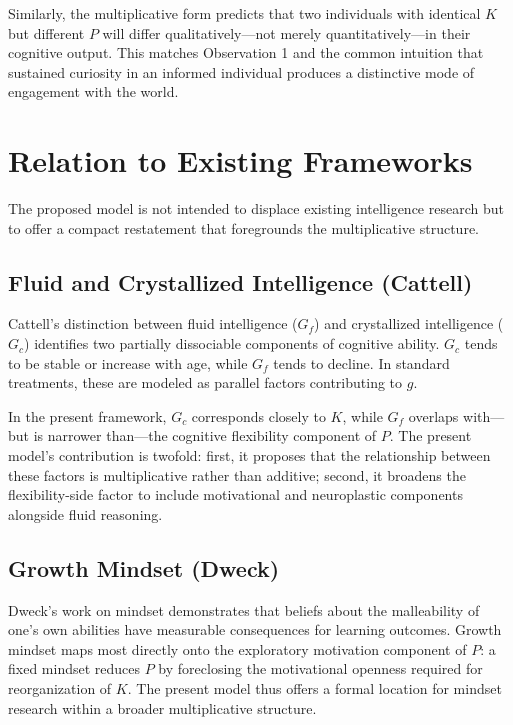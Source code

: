 \documentclass[11pt, a4paper]{article}
\begin{document}
Similarly, the multiplicative form predicts that two individuals with identical $K$ but different $P$ will differ qualitatively---not merely quantitatively---in their cognitive output. This matches Observation 1 and the common intuition that sustained curiosity in an informed individual produces a distinctive mode of engagement with the world.

\section{Relation to Existing Frameworks}

The proposed model is not intended to displace existing intelligence research but to offer a compact restatement that foregrounds the multiplicative structure.

\subsection{Fluid and Crystallized Intelligence (Cattell)}

Cattell's distinction between fluid intelligence ($G_f$) and crystallized intelligence ($G_c$) identifies two partially dissociable components of cognitive ability. $G_c$ tends to be stable or increase with age, while $G_f$ tends to decline. In standard treatments, these are modeled as parallel factors contributing to $g$.

In the present framework, $G_c$ corresponds closely to $K$, while $G_f$ overlaps with---but is narrower than---the cognitive flexibility component of $P$. The present model's contribution is twofold: first, it proposes that the relationship between these factors is multiplicative rather than additive; second, it broadens the flexibility-side factor to include motivational and neuroplastic components alongside fluid reasoning.

\subsection{Growth Mindset (Dweck)}

Dweck's work on mindset demonstrates that beliefs about the malleability of one's own abilities have measurable consequences for learning outcomes. Growth mindset maps most directly onto the exploratory motivation component of $P$: a fixed mindset reduces $P$ by foreclosing the motivational openness required for reorganization of $K$. The present model thus offers a formal location for mindset research within a broader multiplicative structure.
\end{document}
